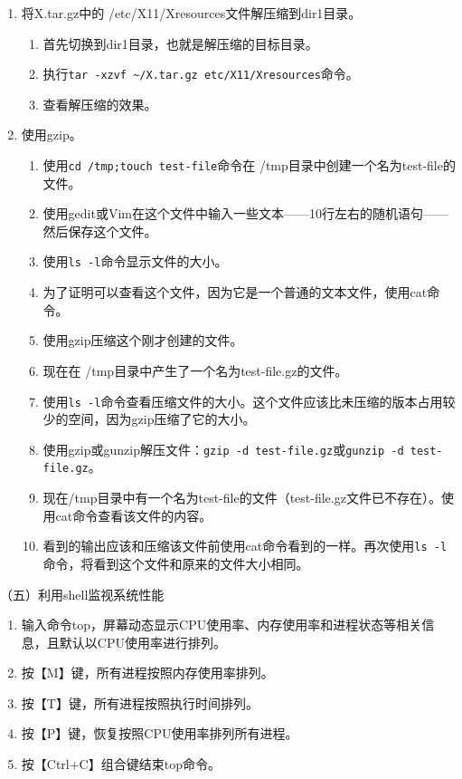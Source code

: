 \begin{enumerate}
\begin{enumerate}
    \end{enumerate}
  \item 将X.tar.gz中的 /etc/X11/Xresources文件解压缩到dir1目录。
    \begin{enumerate}
      \item 首先切换到dir1目录，也就是解压缩的目标目录。
      \item 执行\verb|tar -xzvf ~/X.tar.gz etc/X11/Xresources|命令。
      \item 查看解压缩的效果。
    \end{enumerate}
  \item 使用gzip。
    \begin{enumerate}
      \item 使用\verb|cd /tmp;touch test-file|命令在 /tmp目录中创建一个名为test-file的文件。
      \item 使用gedit或Vim在这个文件中输入一些文本——10行左右的随机语句——然后保存这个文件。
      \item 使用\verb|ls -l|命令显示文件的大小。
      \item 为了证明可以查看这个文件，因为它是一个普通的文本文件，使用cat命令。
      \item 使用gzip压缩这个刚才创建的文件。
      \item 现在在 /tmp目录中产生了一个名为test-file.gz的文件。
      \item 使用\verb|ls -l|命令查看压缩文件的大小。这个文件应该比未压缩的版本占用较少的空间，因为gzip压缩了它的大小。
      \item 使用gzip或gunzip解压文件：\verb|gzip -d test-file.gz|或\verb|gunzip -d test-file.gz|。
      \item 现在/tmp目录中有一个名为test-file的文件（test-file.gz文件已不存在）。使用cat命令查看该文件的内容。
      \item 看到的输出应该和压缩该文件前使用cat命令看到的一样。再次使用\verb|ls -l|命令，将看到这个文件和原来的文件大小相同。
    \end{enumerate}
\end{enumerate}

\vspace{0.1in}
（五）利用shell监视系统性能
\begin{enumerate}
  \item 输入命令top，屏幕动态显示CPU使用率、内存使用率和进程状态等相关信息，且默认以CPU使用率进行排列。
  \item 按【M】键，所有进程按照内存使用率排列。
  \item 按【T】键，所有进程按照执行时间排列。
  \item 按【P】键，恢复按照CPU使用率排列所有进程。
  \item 按【Ctrl+C】组合键结束top命令。
\end{enumerate}

